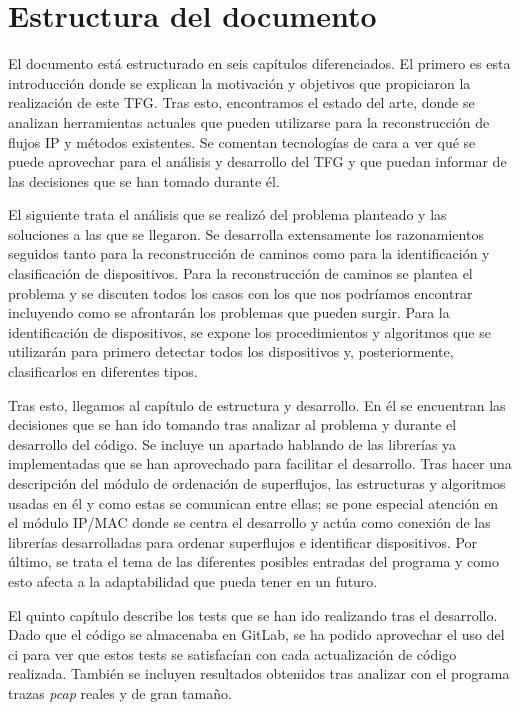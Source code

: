 \documentclass[tfg,epsbased,lof,lot,loa,covers,final,copyright,overleaf]{tfgtfmthesisuam}
\begin{document}
\section{Estructura del documento}
El documento está estructurado en seis capítulos diferenciados. El primero es esta introducción donde se explican la motivación y objetivos que propiciaron la realización de este TFG. Tras esto, encontramos el estado del arte, donde se analizan herramientas actuales que pueden utilizarse para la reconstrucción de flujos IP y métodos existentes. Se comentan tecnologías de cara a ver qué se puede aprovechar para el análisis y desarrollo del TFG y que puedan informar de las decisiones que se han tomado durante él.

El siguiente trata el análisis que se realizó del problema planteado y las soluciones a las que se llegaron. Se desarrolla extensamente los razonamientos seguidos tanto para la reconstrucción de caminos como para la identificación y clasificación de dispositivos. Para la reconstrucción de caminos se plantea el problema y se discuten todos los casos con los que nos podríamos encontrar incluyendo como se afrontarán los problemas que pueden surgir. Para la identificación de dispositivos, se expone los procedimientos y algoritmos que se utilizarán para primero detectar todos los dispositivos y, posteriormente, clasificarlos en diferentes tipos.

Tras esto, llegamos al capítulo de estructura y desarrollo. En él se encuentran las decisiones que se han ido tomando tras analizar al problema y durante el desarrollo del código. Se incluye un apartado hablando de las librerías ya implementadas que se han aprovechado para facilitar el desarrollo. Tras hacer una descripción del módulo de ordenación de superflujos, las estructuras y algoritmos usadas en él y como estas se comunican entre ellas; se pone especial atención en el módulo IP/MAC donde se centra el desarrollo y actúa como conexión de las librerías desarrolladas para ordenar superflujos e identificar dispositivos. Por último, se trata el tema de las diferentes posibles entradas del programa y como esto afecta a la adaptabilidad que pueda tener en un futuro.

El quinto capítulo describe los tests que se han ido realizando tras el desarrollo. Dado que el código se almacenaba en GitLab, se ha podido aprovechar el uso del \gls{ci} para ver que estos tests se satisfacían con cada actualización de código realizada. También se incluyen resultados obtenidos tras analizar con el programa trazas \textit{pcap} reales y de gran tamaño.
\end{document}
